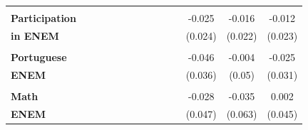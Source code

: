 \begin{landscape}
\begin{table}[ht]
\begin{threeparttable}
\begin{tabular}{lccccccccccccc}
           &            &            &            &            &            &            &            &            &            &            &            &            &            \\

{\bf Participation} &            &            &            &            &            &            &            &            &            &            &     -0.025 &     -0.016 &     -0.012 \\

{\bf in ENEM} &            &            &            &            &            &            &            &            &            &            &    (0.024) &    (0.022) &    (0.023) \\

           &            &            &            &            &            &            &            &            &            &            &            &            &            \\

{\bf Portuguese} &            &            &            &            &            &            &            &            &            &            &     -0.046 &     -0.004 &     -0.025 \\

{\bf ENEM} &            &            &            &            &            &            &            &            &            &            &     (0.036) &      (0.05) &     (0.031) \\

    {\bf } &            &            &            &            &            &            &            &            &            &            &            &            &            \\

{\bf Math} &            &            &            &            &            &            &            &            &            &            &     -0.028 &     -0.035 &      0.002 \\

{\bf ENEM} &            &            &            &            &            &            &            &            &            &            &     (0.047) &     (0.063) &     (0.045) \\


\end{tabular}
\end{threeparttable}
\end{table}
\end{landscape}
